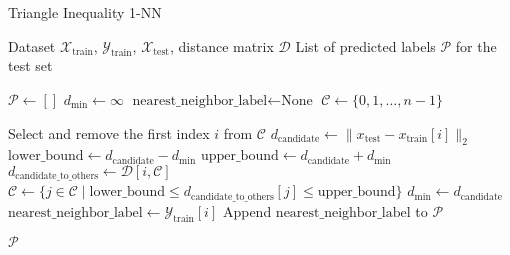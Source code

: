 \documentclass{article}
\theoremstyle{plain}
\theoremstyle{definition}
\theoremstyle{remark}
\begin{document}
\begin{algorithm}[tb]
   \caption{Triangle Inequality 1-NN}
   \label{alg:triangle_inequality_1nn}
\begin{algorithmic}
    Dataset $\mathcal{X}_{\text{train}}$, $\mathcal{Y}_{\text{train}}$, $\mathcal{X}_{\text{test}}$, distance matrix $\mathcal{D}$
     List of predicted labels $\mathcal{P}$ for the test set

   \STATE $\mathcal{P} \gets []$
   \STATE $d_{\text{min}} \gets \infty$
       \STATE $\text{nearest\_neighbor\_label} \gets \text{None}$
       \STATE $\mathcal{C} \gets \{0, 1, \dots, n-1\}$

           \STATE Select and remove the first index $i$ from $\mathcal{C}$
           \STATE $
           d_{\text{candidate}} \gets \|x_{\text{test}} - x_{\text{train}}[i]\|_2$
           \STATE
          $ \text{lower\_bound} \gets d_{\text{candidate}} - d_{\text{min}}$
          \STATE $
           \text{upper\_bound} \gets d_{\text{candidate}} + d_{\text{min}}$
           \STATE $
           d_{\text{candidate\_to\_others}} \gets \mathcal{D}[i, \mathcal{C}]$
           \STATE $
           \mathcal{C} \gets \{j \in \mathcal{C} \mid \text{lower\_bound} \leq d_{\text{candidate\_to\_others}}[j] \leq \text{upper\_bound}\}$
               \STATE $d_{\text{min}} \gets d_{\text{candidate}}$
               \STATE $\text{nearest\_neighbor\_label} \gets \mathcal{Y}_{\text{train}}[i]$
           \ENDIF
       \ENDWHILE
       \STATE Append $\text{nearest\_neighbor\_label}$ to $\mathcal{P}$
   \ENDFOR

    $\mathcal{P}$
\end{algorithmic}
\end{algorithm}
\end{document}
